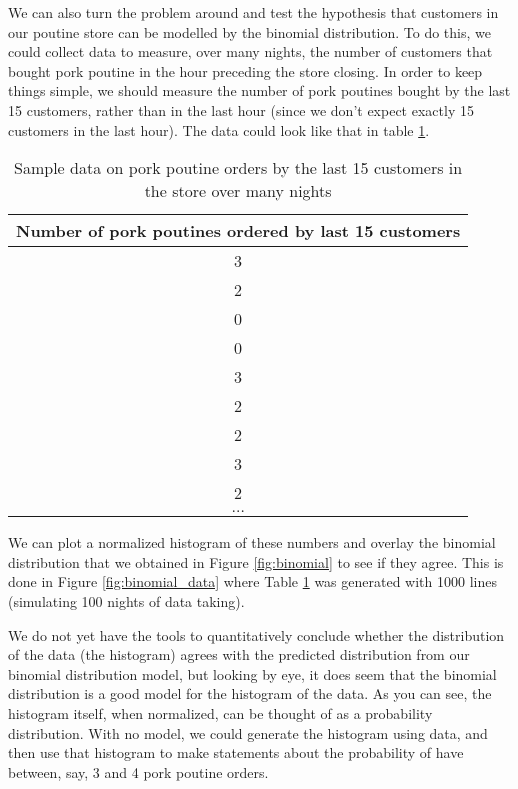
We can also turn the problem around and test the hypothesis that customers in our poutine store can be modelled by the binomial distribution. To do this, we could collect data to measure, over many nights, the number of customers that bought pork poutine in the hour preceding the store closing. In order to keep things simple, we should measure the number of pork poutines bought by the last 15 customers, rather than in the last hour (since we don't expect exactly 15 customers in the last hour). The data could look like that in table \ref{tab:poutineOrders}.
\begin{table}[h!]
\center
\begin{tabular}{|c|}
\hline \textbf{Number of pork poutines ordered by last 15 customers} \\
\hline
3\\
\hline
2\\
\hline
0\\
\hline
0\\
\hline
3\\
\hline
2\\
\hline
2\\
\hline
3\\
\hline
2\\
\hline
 $\dots$ \\
 \hline
\end{tabular}
\caption{\label{tab:poutineOrders} Sample data on pork poutine orders by the last 15 customers in the store over many nights}
\end{table} 

We can plot a normalized histogram of these numbers and overlay the binomial distribution that we obtained in Figure \ref{fig:binomial} to see if they agree. This is done in Figure \ref{fig:binomial_data} where Table \ref{tab:poutineOrders} was generated with 1000 lines (simulating 100 nights of data taking).


We do not yet have the tools to quantitatively conclude whether the distribution of the data (the histogram) agrees with the predicted distribution from our binomial distribution model, but looking by eye, it does seem that the binomial distribution is a good model for the histogram of the data. As you can see, the histogram itself, when normalized, can be thought of as a probability distribution. With no model, we could generate the histogram using data, and then use that histogram to make statements about the probability of have between, say, 3 and 4 pork poutine orders. 

